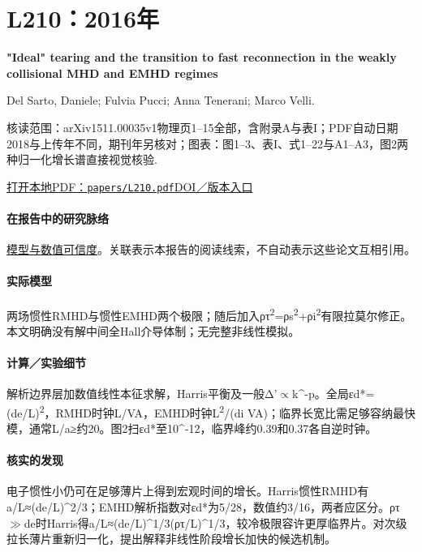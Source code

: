 \documentclass[UTF8,a4paper,11pt,openany,fontset=fandol]{ctexbook}
\begin{document}
\section{L210：2016年}\label{paper:L210}

\textbf{"Ideal" tearing and the transition to fast reconnection in the weakly collisional MHD and EMHD regimes}\citep{L210}\

Del Sarto,  Daniele;  Fulvia Pucci;  Anna Tenerani;  Marco Velli.

\textsf{核读范围：}arXiv1511.00035v1物理页1–15全部，含附录A与表I；PDF自动日期2018与上传年不同，期刊年另核对；\textsf{图表：}图1–3、表I、式1–22与A1–A3，图2两种归一化增长谱直接视觉核验.

\href{run:../papers/L210.pdf}{打开本地PDF：\texttt{papers/L210.pdf}}\quad\href{https://doi.org/10.1002/2015ja021975}{DOI／版本入口}

\paragraph{在报告中的研究脉络}\hyperref[V1-ch:numerics]{模型与数值可信度}。关联表示本报告的阅读线索，不自动表示这些论文互相引用。

\paragraph{实际模型}两场惯性RMHD与惯性EMHD两个极限；随后加入ρτ\textsuperscript{2}=ρs\textsuperscript{2}+ρi\textsuperscript{2}有限拉莫尔修正。本文明确没有解中间全Hall介导体制；无完整非线性模拟。

\paragraph{计算／实验细节}解析边界层加数值线性本征求解，Harris平衡及一般Δ'\ensuremath{\propto}k\textasciicircum{}-p。全局εd*=(de/L)\textsuperscript{2}，RMHD时钟L/VA，EMHD时钟L\textsuperscript{2}/(di VA)；临界长宽比需足够容纳最快模，通常L/a≥约20。图2扫εd*至10\textasciicircum{}-12，临界峰约0.39和0.37各自逆时钟。

\paragraph{核实的发现}电子惯性小仍可在足够薄片上得到宏观时间的增长。Harris惯性RMHD有a/L≈(de/L)\textasciicircum{}2/3；EMHD解析指数对εd*为5/28，数值约3/16，两者应区分。ρτ\ensuremath{\gg}de时Harris得a/L≈(de/L)\textasciicircum{}1/3(ρτ/L)\textasciicircum{}1/3，较冷极限容许更厚临界片。对次级拉长薄片重新归一化，提出解释非线性阶段增长加快的候选机制。
\end{document}
